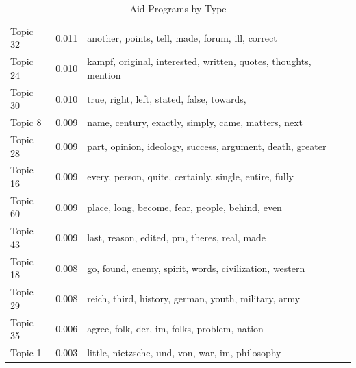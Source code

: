 \documentclass[12pt]{paper}
\begin{document}
\begin{table}[H]
\begin{adjustbox}{width=1\textwidth}
\begin{tabular}{lll}
	Topic 32                           & 0.011                                                  & another, points, tell, made, forum, ill, correct                    \\
	Topic 24                           & 0.010                                                  & kampf, original, interested, written, quotes, thoughts, mention     \\
	Topic 30                           & 0.010                                                  & true, right, left, stated, false, towards,                          \\
	Topic 8                            & 0.009                                                  & name, century, exactly, simply, came, matters, next                 \\
	Topic 28                           & 0.009                                                  & part, opinion, ideology, success, argument, death, greater          \\
	Topic 16                           & 0.009                                                  & every, person, quite, certainly, single, entire, fully              \\
	Topic 60                           & 0.009                                                  & place, long, become, fear, people, behind, even                     \\
	Topic 43                           & 0.009                                                  & last, reason, edited, pm, theres, real, made                        \\
	Topic 18                           & 0.008                                                  & go, found, enemy, spirit, words, civilization, western              \\
	Topic 29                           & 0.008                                                  & reich, third, history, german, youth, military, army                \\
	Topic 35                           & 0.006                                                  & agree, folk, der, im, folks, problem, nation                        \\
	Topic 1                            & 0.003                                                  & little, nietzsche, und, von, war, im, philosophy                   
\end{tabular}
\end{adjustbox}
\caption{Aid Programs by Type} 
\label{}
\end{table}
\end{document}
